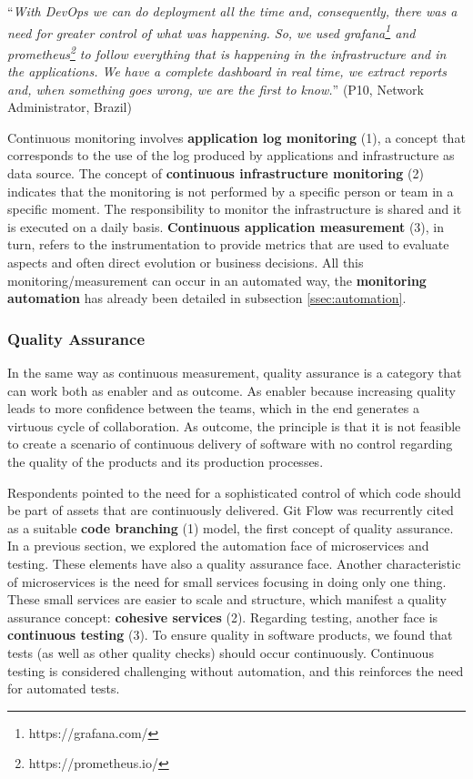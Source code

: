 \begin{mq}
``\emph{With DevOps we can do deployment all the time and, consequently, there was
a need for greater control of what was happening. So, we used
grafana\footnote{https://grafana.com/} and
prometheus\footnote{https://prometheus.io/} to follow everything that is
happening in the infrastructure and in the applications. We have a complete
dashboard in real time, we extract reports and, when something goes wrong, we
are the first to know.}'' (P10, Network Administrator, Brazil)
\end{mq}

Continuous monitoring involves \textbf{application log monitoring} (1), a
concept that corresponds to the use of the log produced by
applications and infrastructure as data source. The concept of
\textbf{continuous infrastructure monitoring} (2) indicates that the monitoring
is not performed by a specific person or team in a specific moment. The
responsibility to monitor the infrastructure is shared and it is executed on
a daily basis. \textbf{Continuous application measurement} (3), in turn, refers to
the instrumentation to provide metrics that are used to evaluate aspects and
often direct evolution or business decisions. All this monitoring/measurement
can occur in an automated way, the \textbf{monitoring automation} has already been
detailed in subsection \ref{ssec:automation}.

\subsubsection{Quality Assurance}

In the same way as continuous measurement, quality assurance is a category that
can work both as enabler and as outcome. As enabler because increasing quality
leads to more confidence between the teams, which in the end generates a virtuous
cycle of collaboration. As outcome, the principle is that it is not
feasible to create a scenario of continuous delivery of software with no control
regarding the quality of the products and its production processes.

Respondents pointed to the need for a sophisticated control of which code should
be part of assets that are continuously delivered. Git Flow was
recurrently cited as a suitable \textbf{code branching} (1) model, the first
concept of quality assurance.
In a previous section, we explored the automation face of
microservices and testing. These elements have also a quality assurance face.
Another characteristic of microservices is the need for small services focusing
in doing only one thing. These small services are easier to scale and
structure, which manifest a quality assurance concept: \textbf{cohesive
services} (2). Regarding testing, another face is \textbf{continuous
testing} (3). To ensure quality in software products, we found that
tests (as well as other quality checks) should occur continuously. Continuous testing
is considered challenging without automation, and this reinforces the need for automated
tests.


